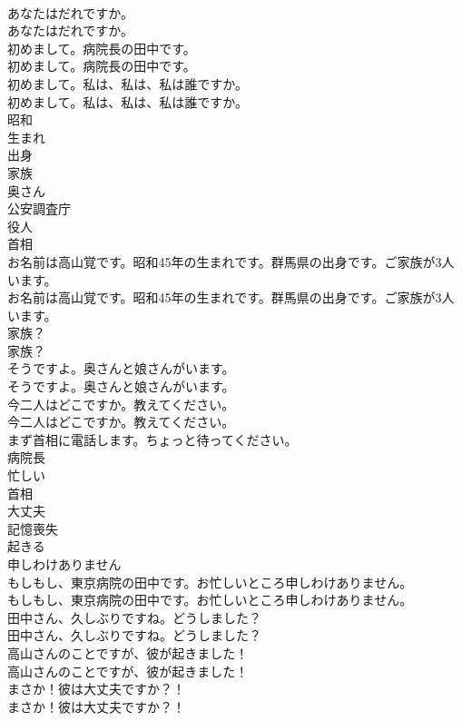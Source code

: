 \documentclass[8pt]{extreport}
\begin{document}
\begin{CJK}{UTF8}{min}
\\	あなたはだれですか。	
\\	あなたはだれですか。 
\\	初めまして。病院長の田中です。	
\\	初めまして。病院長の田中です。 
\\	初めまして。私は、私は、私は誰ですか。	
\\	初めまして。私は、私は、私は誰ですか。 
\\	昭和
\\	生まれ
\\	出身
\\	家族
\\	奥さん
\\	公安調査庁
\\	役人
\\	首相
\\	お名前は高山覚です。昭和45年の生まれです。群馬県の出身です。ご家族が3人います。	
\\	お名前は高山覚です。昭和45年の生まれです。群馬県の出身です。ご家族が3人います。 
\\	家族？	
\\	家族？ 
\\	そうですよ。奥さんと娘さんがいます。	
\\	そうですよ。奥さんと娘さんがいます。 
\\	今二人はどこですか。教えてください。	
\\	今二人はどこですか。教えてください。 
\\	まず首相に電話します。ちょっと待ってください。	
\\	病院長
\\	忙しい
\\	首相
\\	大丈夫
\\	記憶喪失
\\	起きる
\\	申しわけありません
\\	もしもし、東京病院の田中です。お忙しいところ申しわけありません。	
\\	もしもし、東京病院の田中です。お忙しいところ申しわけありません。 
\\	田中さん、久しぶりですね。どうしました？	
\\	田中さん、久しぶりですね。どうしました？ 
\\	高山さんのことですが、彼が起きました！	
\\	高山さんのことですが、彼が起きました！ 
\\	まさか！彼は大丈夫ですか？！	
\\	まさか！彼は大丈夫ですか？！ 

\end{CJK}
\end{document}
